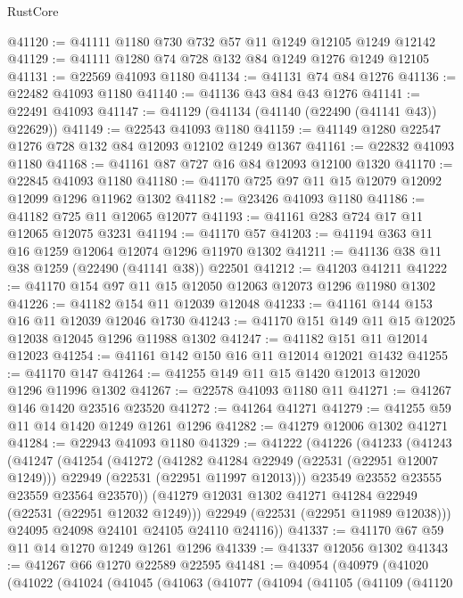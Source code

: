 \begin{lexlean}{RustCore}
\begin{coremodule}
@41120 := @41111 @1180 @730 @732 @57 @11 @1249 @12105 @1249 @12142
@41129 := @41111 @1280 @74 @728 @132 @84 @1249 @1276 @1249 @12105
@41131 := @22569 @41093 @1180
@41134 := @41131 @74 @84 @1276
@41136 := @22482 @41093 @1180
@41140 := @41136 @43 @84 @43 @1276
@41141 := @22491 @41093
@41147 := @41129 (@41134 (@41140 (@22490 (@41141 @43)) @22629))
@41149 := @22543 @41093 @1180
@41159 := @41149 @1280 @22547 @1276 @728 @132 @84 @12093 @12102 @1249 @1367
@41161 := @22832 @41093 @1180
@41168 := @41161 @87 @727 @16 @84 @12093 @12100 @1320
@41170 := @22845 @41093 @1180
@41180 := @41170 @725 @97 @11 @15 @12079 @12092 @12099 @1296 @11962 @1302
@41182 := @23426 @41093 @1180
@41186 := @41182 @725 @11 @12065 @12077
@41193 := @41161 @283 @724 @17 @11 @12065 @12075 @3231
@41194 := @41170 @57
@41203 := @41194 @363 @11 @16 @1259 @12064 @12074 @1296 @11970 @1302
@41211 := @41136 @38 @11 @38 @1259 (@22490 (@41141 @38)) @22501
@41212 := @41203 @41211
@41222 := @41170 @154 @97 @11 @15 @12050 @12063 @12073 @1296 @11980 @1302
@41226 := @41182 @154 @11 @12039 @12048
@41233 := @41161 @144 @153 @16 @11 @12039 @12046 @1730
@41243 := @41170 @151 @149 @11 @15 @12025 @12038 @12045 @1296 @11988 @1302
@41247 := @41182 @151 @11 @12014 @12023
@41254 := @41161 @142 @150 @16 @11 @12014 @12021 @1432
@41255 := @41170 @147
@41264 := @41255 @149 @11 @15 @1420 @12013 @12020 @1296 @11996 @1302
@41267 := @22578 @41093 @1180 @11
@41271 := @41267 @146 @1420 @23516 @23520
@41272 := @41264 @41271
@41279 := @41255 @59 @11 @14 @1420 @1249 @1261 @1296
@41282 := @41279 @12006 @1302 @41271
@41284 := @22943 @41093 @1180
@41329 := @41222
    (@41226
      (@41233
        (@41243
          (@41247
            (@41254
              (@41272
                (@41282 @41284 @22949 (@22531 (@22951 @12007 @1249)))
                @22949
                (@22531 (@22951 @11997 @12013)))
              @23549
              @23552
              @23555
              @23559
              @23564
              @23570))
          (@41279 @12031 @1302 @41271 @41284 @22949 (@22531 (@22951 @12032 @1249)))
          @22949
          (@22531 (@22951 @11989 @12038)))
        @24095
        @24098
        @24101
        @24105
        @24110
        @24116))
@41337 := @41170 @67 @59 @11 @14 @1270 @1249 @1261 @1296
@41339 := @41337 @12056 @1302
@41343 := @41267 @66 @1270 @22589 @22595
@41481 := @40954
    (@40979
      (@41020
        (@41022
          (@41024
            (@41045
              (@41063
                (@41077
                  (@41094
                    (@41105
                      (@41109
                        (@41120

\end{coremodule}
\end{lexlean}
